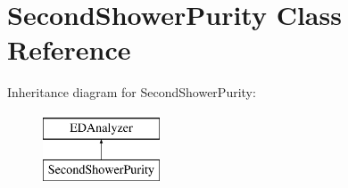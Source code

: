 \hypertarget{classSecondShowerPurity}{\section{Second\-Shower\-Purity Class Reference}
\label{classSecondShowerPurity}
}
Inheritance diagram for Second\-Shower\-Purity\-:\begin{figure}[H]
\begin{center}
\leavevmode
\includegraphics[height=2.000000cm]{classSecondShowerPurity}
\end{center}
\end{figure}
